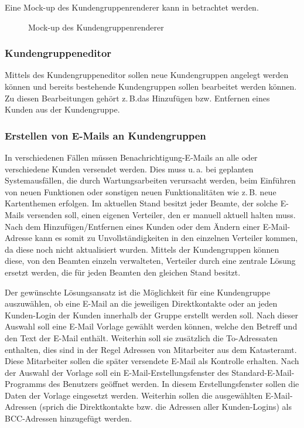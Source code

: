 Eine Mock-up des Kundengruppenrenderer kann in  betrachtet werden.
\begin{figure}[htb]
	\centering
	\caption{Mock-up des Kundengruppenrenderer}
	\label{fig:mockup-kundengruppenrenderer}
\end{figure}

\subsubsection{Kundengruppeneditor}
Mittels des Kundengruppeneditor sollen neue Kundengruppen angelegt werden können und bereits bestehende Kundengruppen sollen bearbeitet werden können. Zu diesen Bearbeitungen gehört z.\,B.das Hinzufügen bzw. Entfernen eines Kunden aus der Kundengruppe.

\subsubsection{Erstellen von E-Mails an Kundengruppen}
In verschiedenen Fällen müssen Benachrichtigung-E-Mails an alle oder verschiedene Kunden versendet werden.
Dies muss u.\,a. bei geplanten Systemausfällen, die durch Wartungsarbeiten verursacht werden, beim Einführen von neuen Funktionen oder sonstigen neuen Funktionalitäten wie z.\,B. neue Kartenthemen erfolgen.
Im aktuellen Stand besitzt jeder Beamte, der solche E-Mails versenden soll, einen eigenen Verteiler, den er manuell aktuell halten muss.
Nach dem Hinzufügen/Entfernen eines Kunden oder dem Ändern einer E-Mail-Adresse kann es somit zu Unvollständigkeiten in den einzelnen Verteiler kommen, da diese noch nicht aktualisiert wurden.
Mittels der Kundengruppen können diese, von den Beamten einzeln verwalteten, Verteiler durch eine zentrale Lösung ersetzt werden, die für jeden Beamten den gleichen Stand besitzt.

Der gewünschte Lösungsansatz ist die Möglichkeit für eine Kundengruppe auszuwählen, ob eine E-Mail an die jeweiligen Direktkontakte oder an jeden Kunden-Login der Kunden innerhalb der Gruppe erstellt werden soll.
Nach dieser Auswahl soll eine E-Mail Vorlage gewählt werden können, welche den Betreff und den Text der E-Mail enthält.
Weiterhin soll sie zusätzlich die To-Adressaten enthalten, dies sind in der Regel Adressen von Mitarbeiter aus dem Katasteramt.
Diese Mitarbeiter sollen die später versendete E-Mail als Kontrolle erhalten. 
Nach der Auswahl der Vorlage soll ein E-Mail-Erstellungsfenster des Standard-E-Mail-Programms des Benutzers geöffnet werden.
In diesem Erstellungsfenster sollen die Daten der Vorlage eingesetzt werden. Weiterhin sollen die ausgewählten E-Mail-Adressen (sprich die Direktkontakte bzw. die Adressen aller Kunden-Logins) als BCC-Adressen hinzugefügt werden.

